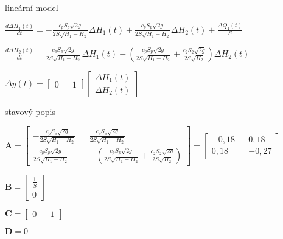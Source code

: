 \documentclass{article}
\begin{document}
			\begin{center}
			lineární model
			
			\bigskip
			
			$\frac{d\Delta H_1(t)}{dt}=-\frac{c_pS_p\sqrt{2g}}{2S\sqrt{H_1-H_2}}\Delta H_1(t)+\frac{c_pS_p\sqrt{2g}}{2S\sqrt{H_1-H_2}}\Delta H_2(t)+\frac{\Delta Q_1(t)}{S}$
			
			\bigskip
			
			$\frac{d\Delta H_2(t)}{dt}=\frac{c_pS_p\sqrt{2g}}{2S\sqrt{H_1-H_2}}\Delta H_1(t)-(\frac{c_pS_p\sqrt{2g}}{2S\sqrt{H_1-H_2}}+\frac{c_2S_2\sqrt{2g}}{2S\sqrt{H_2}})\Delta H_2(t)$
			
			\bigskip
			
			$\Delta y(t)=\begin{bmatrix}
			0 && 1
			\end{bmatrix}
			\begin{bmatrix}
			\Delta H_1(t)\\
			\Delta H_2(t)
			\end{bmatrix}$
			
			\bigskip
			
			stavový popis
			
			\bigskip
			
			$\textbf{A}=\begin{bmatrix}
			-\frac{c_pS_p\sqrt{2g}}{2S\sqrt{H_1-H_2}} && \frac{c_pS_p\sqrt{2g}}{2S\sqrt{H_1-H_2}} \\
			\frac{c_pS_p\sqrt{2g}}{2S\sqrt{H_1-H_2}} && -\left(\frac{c_pS_p\sqrt{2g}}{2S\sqrt{H_1-H_2}}+\frac{c_2S_2\sqrt{2g}}{2S\sqrt{H_2}}\right)
			\end{bmatrix}=\begin{bmatrix}
			-0,18 && 0,18\\
			0,18&& -0,27
			\end{bmatrix}$
			
			\bigskip
			
			$\textbf{B}=\begin{bmatrix}
			\frac{1}{S}\\
			0
			\end{bmatrix}$
			
			\bigskip
			
			$\textbf{C}=\begin{bmatrix}
			0 && 1
			\end{bmatrix}$
			
			\bigskip
			
			$\textbf{D}=0$
			
			\bigskip
			

\end{center}
\end{document}
